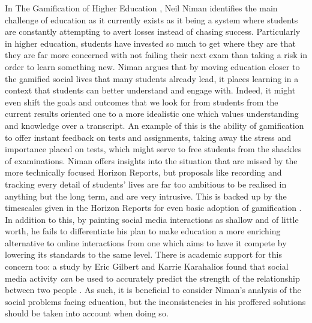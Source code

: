 \documentclass[12pt,a4paper,twoside]{report}
\begin{document}
In The Gamification of Higher Education \cite{niman2014gamification}, Neil Niman identifies the main challenge of education as it currently exists as it being a system where students are constantly attempting to avert losses instead of chasing success. Particularly in higher education, students have invested so much to get where they are that they are far more concerned with not failing their next exam than taking a risk in order to learn something new. Niman argues that by moving education closer to the gamified social lives that many students already lead, it places learning in a context that students can better understand and engage with. Indeed, it might even shift the goals and outcomes that we look for from students from the current results oriented one to a more idealistic one which values understanding and knowledge over a transcript. An example of this is the ability of gamification to offer instant feedback on tests and assignments, taking away the stress and importance placed on tests, which might serve to free students from the shackles of examinations. Niman offers insights into the situation that are missed by the more technically focused Horizon Reports, but proposals like recording and tracking every detail of students' lives are far too ambitious to be realised in anything but the long term, and are very intrusive. This is backed up by the timescales given in the Horizon Reports for even basic adoption of gamification \cite{johnson2013nmc} \cite{johnson2014nmc}. In addition to this, by painting social media interactions as shallow and of little worth, he fails to differentiate his plan to make education a more enriching alternative to online interactions from one which aims to have it compete by lowering its standards to the same level. There is academic support for this concern too: a study by Eric Gilbert and Karrie Karahalios found that social media activity \textit{can} be used to accurately predict the strength of the relationship between two people \cite{gilbert2009predicting}. As such, it is beneficial to consider Niman's analysis of the social problems facing education, but the inconsistencies in his proffered solutions should be taken into account when doing so.
\end{document}
